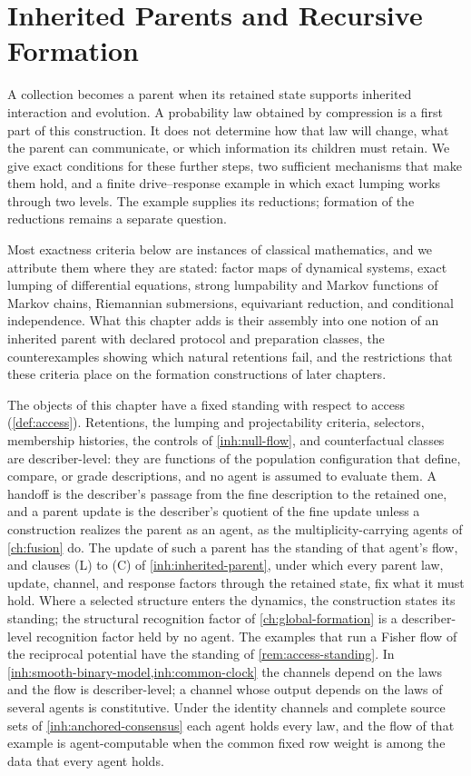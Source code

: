 \chapter{Inherited Parents and Recursive Formation}
\label{ch:inheritance}

A collection becomes a parent when its retained state supports inherited
interaction and evolution. A probability law obtained by compression is a first
part of this construction. It does not determine how that law will change, what
the parent can communicate, or which information its children must retain. We
give exact conditions for these further steps, two sufficient mechanisms
that make them hold, and a finite drive--response example in which exact
lumping works through two levels. The example supplies its reductions;
formation of the reductions remains a separate question.

Most exactness criteria below are instances of classical mathematics, and we
attribute them where they are stated: factor maps of dynamical systems, exact
lumping of differential equations, strong lumpability and Markov functions of
Markov chains, Riemannian submersions, equivariant reduction, and conditional
independence. What this chapter adds is their assembly into one notion of an
inherited parent with declared protocol and preparation classes, the
counterexamples showing which natural retentions fail, and the restrictions
that these criteria place on the formation constructions of later chapters.

The objects of this chapter have a fixed standing with respect to access
(\cref{def:access}). Retentions, the lumping and projectability criteria,
selectors, membership histories, the controls of \cref{inh:null-flow}, and
counterfactual classes are describer-level: they are functions of the
population configuration that define, compare, or grade descriptions, and
no agent is assumed to evaluate them. A handoff is the describer's passage
from the fine description to the retained one, and a parent update is the
describer's quotient of the fine update unless a construction realizes the
parent as an agent, as the multiplicity-carrying agents of \cref{ch:fusion}
do. The update of such a parent has the standing of that agent's flow, and
clauses (L) to (C) of \cref{inh:inherited-parent}, under which every parent
law, update, channel, and response factors through the retained state, fix
what it must hold. Where a selected structure enters the dynamics, the
construction states its standing; the structural recognition factor of
\cref{ch:global-formation} is a describer-level recognition factor held by
no agent. The examples that run a Fisher flow of the reciprocal potential
have the standing of \cref{rem:access-standing}. In
\cref{inh:smooth-binary-model,inh:common-clock} the channels depend on the
laws and the flow is describer-level; a channel whose output depends on the
laws of several agents is constitutive. Under the identity channels and
complete source sets of \cref{inh:anchored-consensus} each agent holds every
law, and the flow of that example is agent-computable when the common fixed
row weight is among the data that every agent holds.


